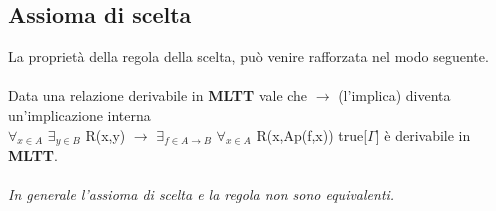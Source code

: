 \subsection{Assioma di scelta}
\label{subsec:assioma-di-scelta}
La propriet\`a della regola della scelta, pu\`o venire rafforzata nel modo seguente.\\\\
\noindent
Data una relazione derivabile in \textbf{MLTT} vale che $\rightarrow$ (l'implica) diventa un'implicazione interna\\
$\forall_{x \in A}$ $\exists_{y \in B}$ R(x,y) $\rightarrow$ $\exists_{f \in A \rightarrow B}$ $\forall_{x \in A}$ R(x,Ap(f,x)) true[$\Gamma$] \`e derivabile in \textbf{MLTT}.
\\\\
\noindent
\textit{In generale l'assioma di scelta e la regola non sono equivalenti.}




